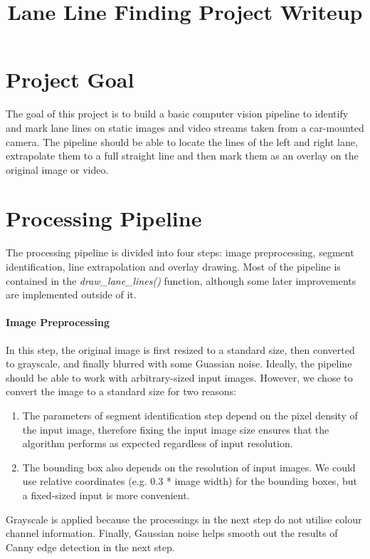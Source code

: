 \documentclass[]{article}
\title{Lane Line Finding Project Writeup}
\begin{document}
\maketitle

\section{Project Goal}
The goal of this project is to build a basic computer vision pipeline to identify and mark lane lines on static images and video streams taken from a car-mounted camera. The pipeline should be able to locate the lines of the left and right lane, extrapolate them to a full straight line and then mark them as an overlay on the original image or video.


\section{Processing Pipeline}
The processing pipeline is divided into four steps: image preprocessing, segment identification, line extrapolation and overlay drawing. Most of the pipeline is contained in the \textit{draw\_lane\_lines()} function, although some later improvements are implemented outside of it.


\paragraph{Image Preprocessing}
In this step, the original image is first resized to a standard size, then converted to grayscale, and finally blurred with some Guassian noise. Ideally, the pipeline should be able to work with arbitrary-sized input images. However, we chose to convert the image to a standard size for two reasons:
\begin{enumerate}
	\item The parameters of segment identification step depend on the pixel density of the input image, therefore fixing the input image size ensures that the algorithm performs as expected regardless of input resolution.
	\item The bounding box also depends on the resolution of input images. We could use relative coordinates (e.g. 0.3 * image width) for the bounding boxes, but a fixed-sized input is more convenient.
\end{enumerate}
Grayscale is applied because the processings in the next step do not utilise colour channel information.
Finally, Gaussian noise helps smooth out the results of Canny edge detection in the next step.
\end{document}
